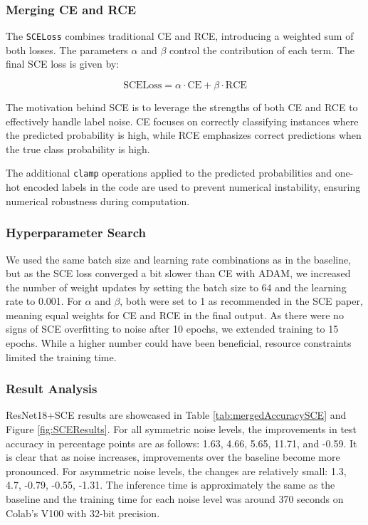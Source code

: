 \documentclass[11pt,twocolumn,letterpaper]{article}
\begin{document}
\subsubsection*{Merging CE and RCE}

The \texttt{SCELoss} combines traditional CE and RCE, introducing a weighted sum of both losses. The parameters \( \alpha \) and \( \beta \) control the contribution of each term. The final SCE loss is given by:

\[
\text{SCELoss} = \alpha \cdot \text{CE} + \beta \cdot \text{RCE}
\]

The motivation behind SCE is to leverage the strengths of both CE and RCE to effectively handle label noise. CE focuses on correctly classifying instances where the predicted probability is high, while RCE emphasizes correct predictions when the true class probability is high.

The additional \texttt{clamp} operations applied to the predicted probabilities and one-hot encoded labels in the code are used to prevent numerical instability, ensuring numerical robustness during computation.

\subsubsection*{Hyperparameter Search}

We used the same batch size and learning rate combinations as in the baseline, but as the SCE loss converged a bit slower than CE with ADAM, we increased the number of weight updates by setting the batch size to 64 and the learning rate to 0.001. For \( \alpha \) and \( \beta \), both were set to 1 as recommended in the SCE paper, meaning equal weights for CE and RCE in the final output. As there were no signs of SCE overfitting to noise after 10 epochs, we extended training to 15 epochs. While a higher number could have been beneficial, resource constraints limited the training time.

\subsubsection*{Result Analysis}
ResNet18+SCE results are showcased in Table \ref{tab:mergedAccuracySCE} and Figure \ref{fig:SCEResults}. For all symmetric noise levels, the improvements in test accuracy in percentage points are as follows: 1.63, 4.66, 5.65, 11.71, and -0.59. It is clear that as noise increases, improvements over the baseline become more pronounced. For asymmetric noise levels, the changes are relatively small: 1.3, 4.7, -0.79, -0.55, -1.31. The inference time is  approximately the same as the baseline and the training time for each noise level was around 370 seconds on Colab's V100 with 32-bit precision.
\end{document}
